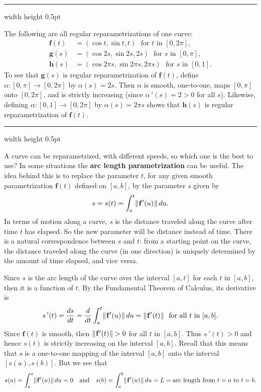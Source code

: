 \smallskip
\hrule width \textwidth height 0.5pt
\begin{exmp}\label{exmp:paramhelix}
 The following are all regular reparametrizations of one curve:
 \begin{align*}
  \mathbf{f}(t) &= (\cos t , \sin t , t) \text{~~for $t$ in~$[0,2\pi]$},\\
  \mathbf{g}(s) &= (\cos 2s , \sin 2s , 2s) \text{~~for $s$ in~$[0,\pi]$},\\
  \mathbf{h}(s) &= (\cos 2\pi s , \sin 2\pi s , 2\pi s) \text{~~for $s$ in~$[0,1]$.}
 \end{align*}
 To see that $\mathbf{g}(s)$ is regular reparametrization of  $\mathbf{f}(t)$, define $\alpha:[0,\pi] \rightarrow [0,2\pi]$ by
 $\alpha(s) = 2s$. 
 Then $\alpha$ is smooth, one-to-one, maps $[0,\pi]$ onto $[0,2\pi]$, and is strictly increasing
 (since $\alpha\,'(s) = 2 > 0$ for all $s$). 
 Likewise, defining $\alpha:[0,1] \rightarrow [0,2\pi]$ by
 $\alpha(s) = 2\pi s$ shows that $\mathbf{h}(s)$ is regular reparametrization of  $\mathbf{f}(t)$.
\end{exmp}
\hrule width \textwidth height 0.5pt
\vskip3mm

A curve can be reparametrized, with different speeds, so which one is the best to use? In some situations
the \textbf{arc length parametrization} can be useful. The idea behind this is to replace the parameter $t$, for any
given smooth parametrization $\mathbf{f}(t)$ defined on $[a,b]$, by the parameter $s$ given by
\begin{equation}\label{eqn:arclenfcn}
 s = s(t) = \int_{a}^{t} \lVert\mspace{1mu}\mathbf{f}'(u)\mspace{1mu}\rVert\,du .
\end{equation}
In terms of motion along a curve, $s$ is the distance traveled along the curve after time $t$ has elapsed.
So the new parameter will be distance instead of time.
There is a natural correspondence between $s$ and $t$: from a starting point on the curve, the distance
traveled along the curve (in one direction) is uniquely determined by the amount of time elapsed, and vice versa.

Since $s$ is the arc length of the curve over the interval $[a,t]$ for each $t$ in $[a,b]$, then it is a function
of $t$. By the Fundamental Theorem of Calculus, its derivative is
\begin{displaymath}
 s\,'(t) = \dfrac{ds}{dt} = \dfrac{d}{dt} \int_{a}^{t} \lVert\mspace{1mu}\mathbf{f}'(u)\mspace{1mu}\rVert\,du =
 \lVert\mspace{1mu}\mathbf{f}'(t)\mspace{1mu}\rVert \text{~~for all $t$ in $[a,b]$.}
\end{displaymath}
Since $\mathbf{f}(t)$ is smooth, then $\lVert\mspace{1mu}\mathbf{f}'(t)\mspace{1mu}\rVert > 0$ for all $t$ in $[a,b]$. Thus $s\,'(t) > 0$
and hence $s(t)$ is strictly increasing on the interval $[a,b]$. Recall that this means that $s$ is a one-to-one mapping
of the interval $[a,b]$ onto the interval $[s(a),s(b)]$. But we see that
\begin{displaymath}
 s(a) = \int_{a}^{a} \lVert\mspace{1mu}\mathbf{f}'(u)\mspace{1mu}\rVert\,du = 0 \quad \text{and} \quad
 s(b) = \int_{a}^{b} \lVert\mspace{1mu}\mathbf{f}'(u)\mspace{1mu}\rVert\,du = L = \text{arc length from $t = a$ to $t = b$.}
\end{displaymath}

